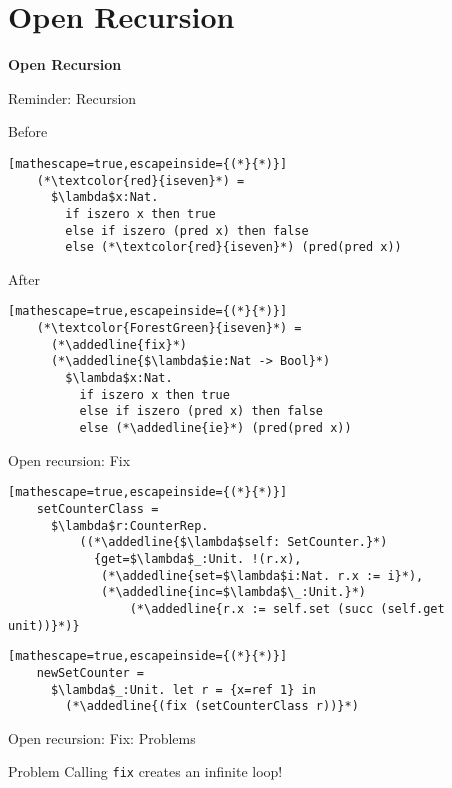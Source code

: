 \documentclass[presentation,xcolor=svgnames]{beamer}
\newcommand{\sectionframe}[1]{
  \begin{frame}
    \centering
    \huge \usebeamercolor[fg]{structure} \textbf{#1}
  \end{frame}
}
\begin{document}
\section{Open Recursion}



\sectionframe{Open Recursion}

\begin{frame}[fragile]{Reminder: Recursion}
  \begin{block}{Before}
  \begin{lstlisting}[mathescape=true,escapeinside={(*}{*)}]
    (*\textcolor{red}{iseven}*) =
      $\lambda$x:Nat.
        if iszero x then true
        else if iszero (pred x) then false
        else (*\textcolor{red}{iseven}*) (pred(pred x))
  \end{lstlisting}
  \end{block}

  \begin{block}{After}
  \begin{lstlisting}[mathescape=true,escapeinside={(*}{*)}]
    (*\textcolor{ForestGreen}{iseven}*) =
      (*\addedline{fix}*)
      (*\addedline{$\lambda$ie:Nat -> Bool}*)
        $\lambda$x:Nat.
          if iszero x then true
          else if iszero (pred x) then false
          else (*\addedline{ie}*) (pred(pred x))
  \end{lstlisting}
  \end{block}
\end{frame}

\begin{frame}[fragile]{Open recursion: Fix}
  \begin{lstlisting}[mathescape=true,escapeinside={(*}{*)}]
    setCounterClass =
      $\lambda$r:CounterRep.
          ((*\addedline{$\lambda$self: SetCounter.}*)
            {get=$\lambda$_:Unit. !(r.x),
             (*\addedline{set=$\lambda$i:Nat. r.x := i}*),
             (*\addedline{inc=$\lambda$\_:Unit.}*)
                 (*\addedline{r.x := self.set (succ (self.get unit))}*)}
  \end{lstlisting}
  \begin{lstlisting}[mathescape=true,escapeinside={(*}{*)}]
    newSetCounter =
      $\lambda$_:Unit. let r = {x=ref 1} in
        (*\addedline{(fix (setCounterClass r))}*)
  \end{lstlisting}
\end{frame}

\begin{frame}[fragile]{Open recursion: Fix: Problems}
  \begin{block}{Problem}
    Calling \texttt{fix} creates an infinite loop!
  \end{block}
\end{frame}
\end{document}

